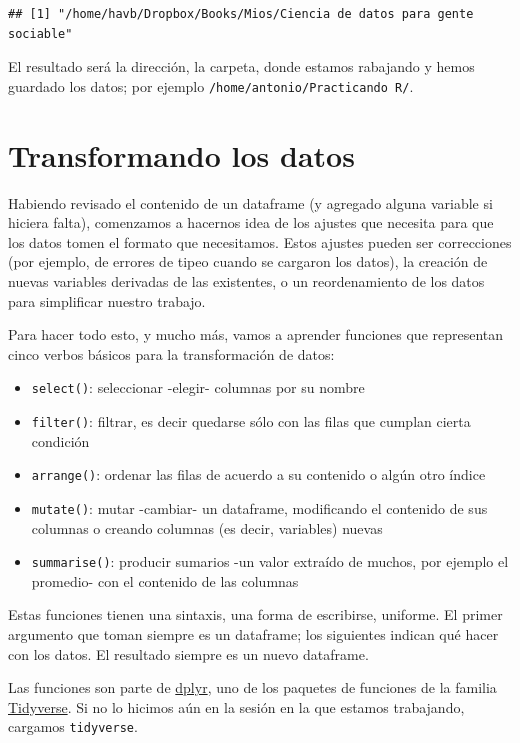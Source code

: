 \documentclass[]{book}
\providecommand{\tightlist}{%
  \setlength{\itemsep}{0pt}\setlength{\parskip}{0pt}}
\begin{document}
\begin{verbatim}
## [1] "/home/havb/Dropbox/Books/Mios/Ciencia de datos para gente sociable"
\end{verbatim}

El resultado será la dirección, la carpeta, donde estamos rabajando y
hemos guardado los datos; por ejemplo
\texttt{/home/antonio/Practicando\ R/}.

\section{Transformando los datos}\label{transformando-los-datos}

Habiendo revisado el contenido de un dataframe (y agregado alguna
variable si hiciera falta), comenzamos a hacernos idea de los ajustes
que necesita para que los datos tomen el formato que necesitamos. Estos
ajustes pueden ser correcciones (por ejemplo, de errores de tipeo cuando
se cargaron los datos), la creación de nuevas variables derivadas de las
existentes, o un reordenamiento de los datos para simplificar nuestro
trabajo.

Para hacer todo esto, y mucho más, vamos a aprender funciones que
representan cinco verbos básicos para la transformación de datos:

\begin{itemize}
\tightlist
\item
  \texttt{select()}: seleccionar -elegir- columnas por su nombre
\item
  \texttt{filter()}: filtrar, es decir quedarse sólo con las filas que
  cumplan cierta condición
\item
  \texttt{arrange()}: ordenar las filas de acuerdo a su contenido o
  algún otro índice
\item
  \texttt{mutate()}: mutar -cambiar- un dataframe, modificando el
  contenido de sus columnas o creando columnas (es decir, variables)
  nuevas
\item
  \texttt{summarise()}: producir sumarios -un valor extraído de muchos,
  por ejemplo el promedio- con el contenido de las columnas
\end{itemize}

Estas funciones tienen una sintaxis, una forma de escribirse, uniforme.
El primer argumento que toman siempre es un dataframe; los siguientes
indican qué hacer con los datos. El resultado siempre es un nuevo
dataframe.

Las funciones son parte de \href{http://dplyr.tidyverse.org/}{dplyr},
uno de los paquetes de funciones de la familia
\href{https://www.tidyverse.org/}{Tidyverse}. Si no lo hicimos aún en la
sesión en la que estamos trabajando, cargamos \texttt{tidyverse}.
\end{document}

